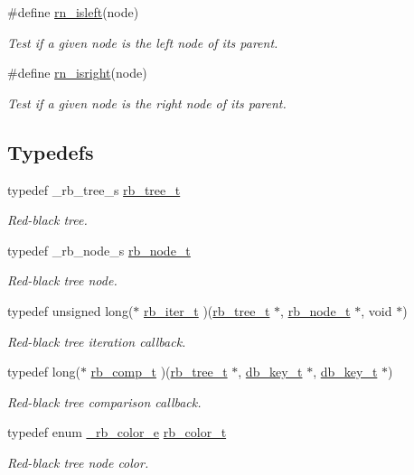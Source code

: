 \begin{CompactItemize}
\#define \hyperlink{group__dbprim__rbtree_a36}{rn\_\-isleft}(node)
\begin{CompactList}\small\item\em Test if a given node is the left node of its parent. \item\end{CompactList}\item 
\#define \hyperlink{group__dbprim__rbtree_a37}{rn\_\-isright}(node)
\begin{CompactList}\small\item\em Test if a given node is the right node of its parent. \item\end{CompactList}\end{CompactItemize}
\subsection*{Typedefs}
\begin{CompactItemize}
\item 
typedef \_\-rb\_\-tree\_\-s \hyperlink{group__dbprim__rbtree_a0}{rb\_\-tree\_\-t}
\begin{CompactList}\small\item\em Red-black tree. \item\end{CompactList}\item 
typedef \_\-rb\_\-node\_\-s \hyperlink{group__dbprim__rbtree_a1}{rb\_\-node\_\-t}
\begin{CompactList}\small\item\em Red-black tree node. \item\end{CompactList}\item 
typedef unsigned long($\ast$ \hyperlink{group__dbprim__rbtree_a2}{rb\_\-iter\_\-t} )(\hyperlink{dbprim_8h_a0}{rb\_\-tree\_\-t} $\ast$, \hyperlink{dbprim_8h_a1}{rb\_\-node\_\-t} $\ast$, void $\ast$)
\begin{CompactList}\small\item\em Red-black tree iteration callback. \item\end{CompactList}\item 
typedef long($\ast$ \hyperlink{group__dbprim__rbtree_a3}{rb\_\-comp\_\-t} )(\hyperlink{dbprim_8h_a0}{rb\_\-tree\_\-t} $\ast$, \hyperlink{dbprim_8h_a0}{db\_\-key\_\-t} $\ast$, \hyperlink{dbprim_8h_a0}{db\_\-key\_\-t} $\ast$)
\begin{CompactList}\small\item\em Red-black tree comparison callback. \item\end{CompactList}\item 
typedef enum \hyperlink{group__dbprim__rbtree_a38}{\_\-rb\_\-color\_\-e} \hyperlink{group__dbprim__rbtree_a4}{rb\_\-color\_\-t}
\begin{CompactList}\small\item\em Red-black tree node color. \item\end{CompactList}\end{CompactItemize}
